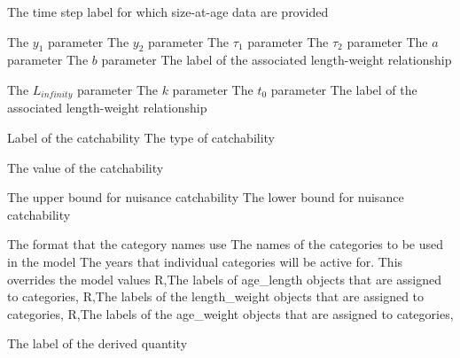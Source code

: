  {The time step label for which size-at-age data are provided}
\par\textbf{}\par
\par\textbf{}\par
{} {The $y_1$ parameter}
 {The $y_2$ parameter}
 {The $\tau_1$ parameter}
 {The $\tau_2$ parameter}
 {The $a$ parameter}
 {The $b$ parameter}
 {The label of the associated length-weight relationship}
\par\textbf{}\par
{} {The $L_{infinity}$ parameter}
 {The $k$ parameter}
 {The $t_0$ parameter}
 {The label of the associated length-weight relationship}
\par\par
{} {Label of the catchability}
 {The type of catchability}
\par\textbf{}\par
{} {The value of the catchability}
\par\textbf{}\par
{} {The upper bound for nuisance catchability}
 {The lower bound for nuisance catchability}
 {}
\par\par
{} {The format that the category names use}
 {The names of the categories to be used in the model}
 {The years that individual categories will be active for. This overrides the model values}
 {R,The labels of age\_length objects that are assigned to categories,}
 {R,The labels of the length\_weight objects that are assigned to categories,}
 {R,The labels of the age\_weight objects that are assigned to categories,}
\par\par
{} {The label of the derived quantity}
